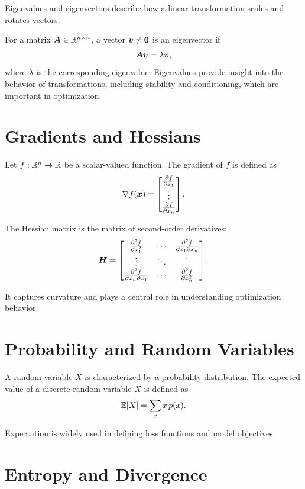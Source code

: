 Eigenvalues and eigenvectors describe how a linear transformation scales and rotates vectors.

For a matrix $\bm{A} \in \mathbb{R}^{n \times n}$, a vector $\bm{v} \neq \bm{0}$ is an eigenvector if
\[
    \bm{A}\bm{v} = \lambda \bm{v},
\]
where $\lambda$ is the corresponding eigenvalue. Eigenvalues provide insight into the behavior of transformations, including stability and conditioning, which are important in optimization.


\section{Gradients and Hessians}

Let $f : \mathbb{R}^n \rightarrow \mathbb{R}$ be a scalar-valued function. The gradient of $f$ is defined as
\[
    \nabla f(\bm{x}) =
    \begin{bmatrix}
        \frac{\partial f}{\partial x_1} \\
        \vdots                          \\
        \frac{\partial f}{\partial x_n}
    \end{bmatrix}.
\]

The Hessian matrix is the matrix of second-order derivatives:
\[
    \bm{H} =
    \begin{bmatrix}
        \frac{\partial^2 f}{\partial x_1^2}            & \cdots & \frac{\partial^2 f}{\partial x_1 \partial x_n} \\
        \vdots                                         & \ddots & \vdots                                         \\
        \frac{\partial^2 f}{\partial x_n \partial x_1} & \cdots & \frac{\partial^2 f}{\partial x_n^2}
    \end{bmatrix}.
\]

It captures curvature and plays a central role in understanding optimization behavior.


\section{Probability and Random Variables}

A random variable $X$ is characterized by a probability distribution. The expected value of a discrete random variable $X$ is defined as
\[
    \mathbb{E}[X] = \sum_x x \, p(x).
\]

Expectation is widely used in defining loss functions and model objectives.


\section{Entropy and Divergence}

